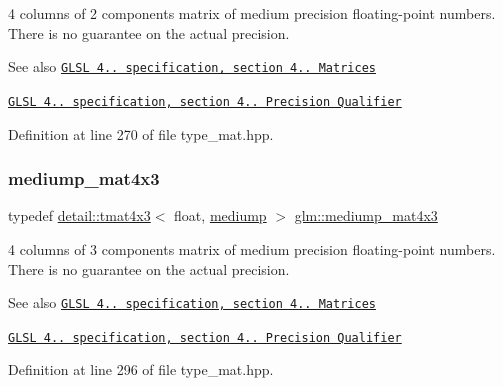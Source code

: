 4 columns of 2 components matrix of medium precision floating-\/point numbers. There is no guarantee on the actual precision.

\begin{DoxySeeAlso}{See also}
\href{http://www.opengl.org/registry/doc/GLSLangSpec.4.20.8.pdf}{\tt G\+L\+SL 4.. specification, section 4.. Matrices} 

\href{http://www.opengl.org/registry/doc/GLSLangSpec.4.20.8.pdf}{\tt G\+L\+SL 4.. specification, section 4.. Precision Qualifier} 
\end{DoxySeeAlso}


Definition at line 270 of file type\+\_\+mat.\+hpp.

\mbox{\label{group__core__precision_ga445d8aac3a5227af2d1e98d5c2f74d03}} 
\subsubsection{\texorpdfstring{mediump\+\_\+mat4x3}{mediump\_mat4x3}}
{\footnotesize\ttfamily typedef \hyperlink{structglm_1_1detail_1_1tmat4x3}{detail\+::tmat4x3}$<$ float, \hyperlink{namespaceglm_a0f04f086094c747d227af4425893f545a6416f3ea0c9025fb21ed50c4d6620482}{mediump} $>$ \hyperlink{group__core__precision_ga445d8aac3a5227af2d1e98d5c2f74d03}{glm\+::mediump\+\_\+mat4x3}}

4 columns of 3 components matrix of medium precision floating-\/point numbers. There is no guarantee on the actual precision.

\begin{DoxySeeAlso}{See also}
\href{http://www.opengl.org/registry/doc/GLSLangSpec.4.20.8.pdf}{\tt G\+L\+SL 4.. specification, section 4.. Matrices} 

\href{http://www.opengl.org/registry/doc/GLSLangSpec.4.20.8.pdf}{\tt G\+L\+SL 4.. specification, section 4.. Precision Qualifier} 
\end{DoxySeeAlso}


Definition at line 296 of file type\+\_\+mat.\+hpp.

\mbox{\label{group__core__precision_gacb51d2d10f7607617ac544f6db9a6eef}} 
